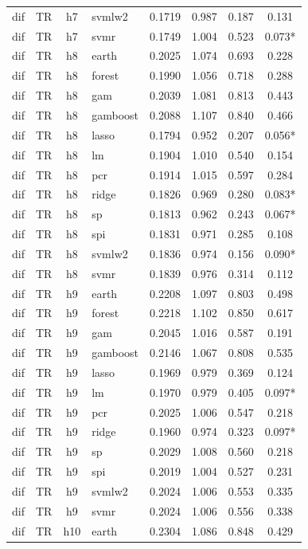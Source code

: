 \begin{ThreePartTable}
\begin{longtable}[t]{llclcccc}
dif & TR & h7 & svmlw2 & 0.1719 & 0.987 & 0.187 & 0.131\\
dif & TR & h7 & svmr & 0.1749 & 1.004 & 0.523 & 0.073*\\
\addlinespace
dif & TR & h8 & earth & 0.2025 & 1.074 & 0.693 & 0.228\\
dif & TR & h8 & forest & 0.1990 & 1.056 & 0.718 & 0.288\\
dif & TR & h8 & gam & 0.2039 & 1.081 & 0.813 & 0.443\\
dif & TR & h8 & gamboost & 0.2088 & 1.107 & 0.840 & 0.466\\
dif & TR & h8 & lasso & 0.1794 & 0.952 & 0.207 & 0.056*\\
dif & TR & h8 & lm & 0.1904 & 1.010 & 0.540 & 0.154\\
dif & TR & h8 & pcr & 0.1914 & 1.015 & 0.597 & 0.284\\
dif & TR & h8 & ridge & 0.1826 & 0.969 & 0.280 & 0.083*\\
dif & TR & h8 & sp & 0.1813 & 0.962 & 0.243 & 0.067*\\
dif & TR & h8 & spi & 0.1831 & 0.971 & 0.285 & 0.108\\
dif & TR & h8 & svmlw2 & 0.1836 & 0.974 & 0.156 & 0.090*\\
dif & TR & h8 & svmr & 0.1839 & 0.976 & 0.314 & 0.112\\
\addlinespace
dif & TR & h9 & earth & 0.2208 & 1.097 & 0.803 & 0.498\\
dif & TR & h9 & forest & 0.2218 & 1.102 & 0.850 & 0.617\\
dif & TR & h9 & gam & 0.2045 & 1.016 & 0.587 & 0.191\\
dif & TR & h9 & gamboost & 0.2146 & 1.067 & 0.808 & 0.535\\
dif & TR & h9 & lasso & 0.1969 & 0.979 & 0.369 & 0.124\\
dif & TR & h9 & lm & 0.1970 & 0.979 & 0.405 & 0.097*\\
dif & TR & h9 & pcr & 0.2025 & 1.006 & 0.547 & 0.218\\
dif & TR & h9 & ridge & 0.1960 & 0.974 & 0.323 & 0.097*\\
dif & TR & h9 & sp & 0.2029 & 1.008 & 0.560 & 0.218\\
dif & TR & h9 & spi & 0.2019 & 1.004 & 0.527 & 0.231\\
dif & TR & h9 & svmlw2 & 0.2024 & 1.006 & 0.553 & 0.335\\
dif & TR & h9 & svmr & 0.2024 & 1.006 & 0.556 & 0.338\\
\addlinespace
dif & TR & h10 & earth & 0.2304 & 1.086 & 0.848 & 0.429\\

\end{longtable}
\end{ThreePartTable}
